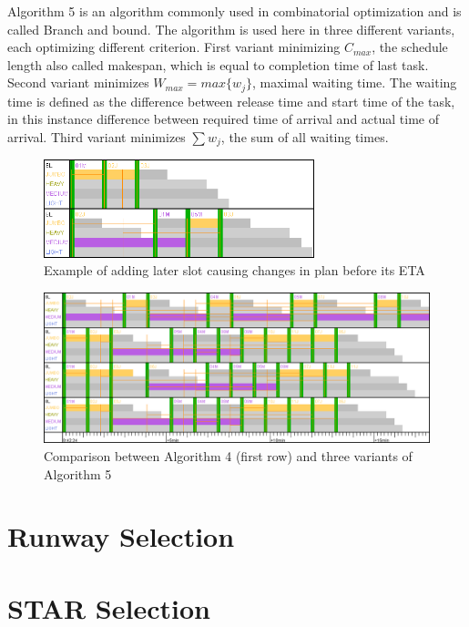 Algorithm 5 is an algorithm commonly used in combinatorial optimization and is called Branch and bound. The algorithm is used here in three different variants, each optimizing different criterion. First variant minimizing $C_{max}$, the schedule length also called makespan, which is equal to completion time of last task.  Second variant minimizes $W_{max} = max\{w_j\}$, maximal waiting time. The waiting time is defined as the difference between release time and start time of the task, in this instance difference between required time of arrival and actual time of arrival. Third variant minimizes $\sum{w_j}$, the sum of all waiting times.

\begin{figure}[h]
    \centering
    \includegraphics[width=0.7\textwidth]{figures/rwy-proof.png}
    \caption{Example of adding later slot causing changes in plan before its ETA}
    \label{fig:rwy-proof}
\end{figure}

\begin{figure}[h]
    \centering
    \includegraphics[width=\textwidth]{figures/rwy-bab.png}
    \caption{Comparison between Algorithm 4 (first row) and three variants of Algorithm 5}
    \label{fig:rwy-bab}
\end{figure}

\section{Runway Selection}

\section{STAR Selection}

